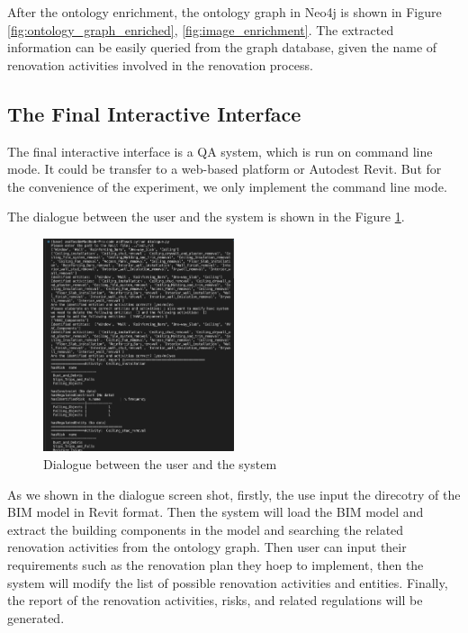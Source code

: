 After the ontology enrichment, the ontology graph in Neo4j is shown in Figure \ref{fig:ontology_graph_enriched}, \ref{fig:image_enrichment}.
The extracted information can be easily queried from the graph database, given the name of renovation activities involved in the renovation process.

\subsection{The Final Interactive Interface}
The final interactive interface is a QA system, which is run on command line mode. It could be transfer to a web-based platform
or Autodest Revit. But for the convenience of the experiment, we only implement the command line mode.

The dialogue between the user and the system is shown in the Figure \ref{fig:dialogue}.
\begin{figure}
    \centering
    \label{fig:dialogue}
    \includegraphics[width=0.5\textwidth]{figures/output screen shot.png}
    \caption{Dialogue between the user and the system}
    
\end{figure}

As we shown in the dialogue screen shot, firstly, the use input the direcotry of the BIM model in Revit format. 
Then the system will load the BIM model and extract the building components in the model and searching the related renovation activities from 
the ontology graph. Then user can input their requirements such as the renovation plan they hoep to implement, then the system will
modify the list of possible renovation activities and entities. Finally, the report of the renovation activities, risks, and related regulations will be generated.

